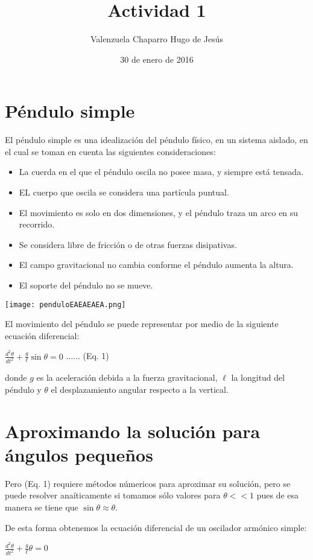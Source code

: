 \documentclass[12pt]{article}
\title{Actividad 1}
\author{Valenzuela Chaparro Hugo de Jesús}
\date{30 de enero de 2016}
\begin{document}
\maketitle

\section{Péndulo simple}
El péndulo simple es una idealización del péndulo físico, en un sistema aislado, en el cual se toman en cuenta las siguientes consideraciones:
\begin{itemize}
\item La cuerda en el que el péndulo oscila no posee masa, y siempre está tensada.
\item EL cuerpo que oscila se considera una partícula puntual.
\item El movimiento es solo en dos dimensiones, y el péndulo traza un arco en su recorrido.
\item Se considera libre de fricción o de otras fuerzas disipativas.
\item El campo gravitacional no cambia conforme el péndulo aumenta la altura.
\item El soporte del péndulo no se mueve.
\end{itemize}

\begin{center}
\texttt{[image: penduloEAEAEAEA.png]}
\end{center}

El movimiento del péndulo se puede representar por medio de la siguiente ecuación diferencial:

$\frac{d^2 \theta}{d t^2}+\frac{g}{\ell}\sin\theta = 0$ ...... (Eq. 1)

\noindent donde $g$ es la aceleración debida a la fuerza gravitacional, $\ell$ la longitud del péndulo y $\theta$ el desplazamiento angular respecto a la vertical.

\section{Aproximando la solución para ángulos pequeños}
Pero (Eq. 1) requiere métodos númericos para aproximar su solución, pero se puede resolver anaíticamente si tomamos sólo valores para $\theta<<1$ pues de esa manera se tiene que $\sin\theta\approx\theta$.

De esta forma obtenemos la ecuación diferencial de un oscilador armónico simple:

$\frac{d^2 \theta}{d t^2}+\frac{g}{\ell}\theta = 0$
\end{document}
